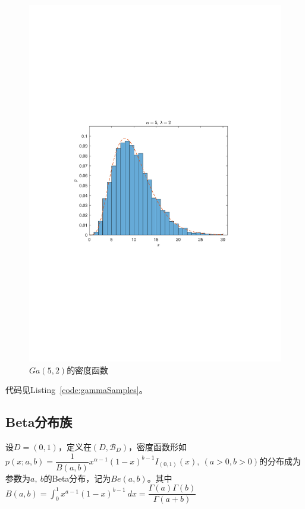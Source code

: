 \begin{figure}[htbp]
\begin{minipage}[t]{0.5\textwidth}
        \includegraphics[width = \textwidth]{image/gammapdf.pdf}
        \caption{$Ga(5, 2)$的密度函数}
        \label{fig:gammapdf}
    \end{minipage}
\end{figure}

代码见Listing~\ref{code:gammaSamples}。


\subsection{Beta分布族}
\begin{newdef}[Beta分布]
    设$D=(0,1)$，定义在$(D,\mathscr{B}_D)$，密度函数形如$p(x;a,b) = \dfrac{1}{B(a,b)}x^{\alpha-1}(1-x)^{b-1}I_{(0,1)}(x),\ (a>0, b>0)$的分布成为参数为$a,\ b$的Beta分布，记为$Be(a,b)$。其中$B(a,b) = \displaystyle \int_{0}^{1}x^{a-1}(1-x)^{b-1}\ dx = \dfrac{\Gamma(a)\Gamma(b)}{\Gamma(a+b)}$    
\end{newdef}

